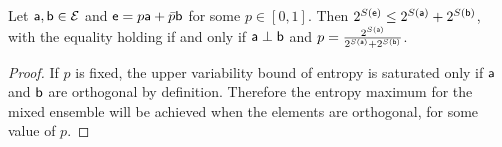\begin{mathSection}
\begin{prop}\label{pm_es_exponentialEntropySubadditivity}
	Let $\ens[a], \ens[b] \in \Ens$ and $\ens = p \ens[a] + \bar{p} \ens[b]$ for some $p \in [0,1]$. Then $2^{S(\ens)} \leq 2^{S(\ens[a])} + 2^{S(\ens[b])}$, with the equality holding if and only if $\ens[a] \ortho \ens[b]$ and $p = \frac{2^{S(\ens[a])}}{2^{S(\ens[a])} + 2^{S(\ens[b])}}$.
\end{prop}

\begin{proof}
	If $p$ is fixed, the upper variability bound of entropy is saturated only if $\ens[a]$ and $\ens[b]$ are orthogonal by definition. Therefore the entropy maximum for the mixed ensemble will be achieved when the elements are orthogonal, for some value of $p$.
	

\end{proof}
\end{mathSection}
